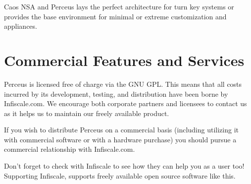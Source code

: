 \documentclass[10pt,letterpaper]{article}
\begin{document}
Caos NSA and Perceus lays the perfect architecture for turn key systems or
provides the base environment for minimal or extreme customization and
appliances.

\section{Commercial Features and Services}

Perceus is licensed free of charge via the GNU GPL.  This means that all costs
incurred by its development, testing, and distribution have been borne by
Infiscale.com.  We encourage both corporate partners and licensees to contact
us as it helps us to maintain our freely available product.

If you wish to distribute Perceus on a commercial basis (including utilizing
it with commercial software or with a hardware purchase) you should pursue a
commercial relationship with Infiscale.com.

Don't forget to check with Infiscale to see how they can help you as a user too!
Supporting Infiscale, supports freely available open source software like this.

\indent 
\end{document}
